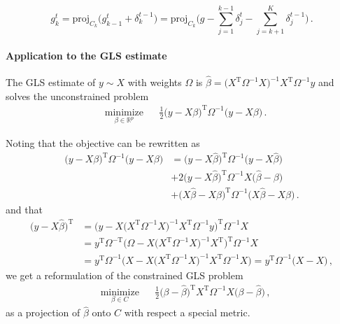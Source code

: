 \documentclass[a4paper]{article}
\newcommand{\real}{\mathbb{R}}
\newcommand{\T}{\mathrm{T}}
\begin{document}
\begin{equation*}
  g^t_k
    = \mathrm{proj}_{C_k}\bigl(
      g^t_{k-1} + \delta^{t-1}_k
    \bigr)
    = \mathrm{proj}_{C_k}\biggl(
      g - \sum_{j=1}^{k-1} \delta^t_j - \sum_{j=k+1}^K \delta^{t-1}_j
    \biggr)
    \,.
\end{equation*}



\paragraph{Application to the GLS estimate} %
\label{par:application_to_the_gls_estimate}

The GLS estimate of $y\sim X$ with weights $\Omega$ is $\hat{\beta} = \bigl(X^\T \Omega^{-1} X
\bigr)^{-1} X^\T \Omega^{-1} y$ and solves the unconstrained problem
\begin{equation} \label{eq:gls_unc}
  \begin{aligned}
    & \underset{\beta\in \real^p}{\text{minimize}}
      & & \tfrac12 \bigl(y - X \beta\bigr)^\T \Omega^{-1} \bigl(y - X \beta\bigr)
          \,.
  \end{aligned}
\end{equation}

Noting that the objective can be rewritten as
\begin{align*}
  \bigl(y - X \beta\bigr)^\T \Omega^{-1} \bigl(y - X \beta\bigr)
    &= \bigl(y - X \hat{\beta}\bigr)^\T \Omega^{-1} \bigl(y - X \hat{\beta}\bigr)
    \\
    &+ 2 \bigl(y - X \hat{\beta}\bigr)^\T \Omega^{-1} X \bigl(\hat{\beta} - \beta\bigr)
    \\
    &+ \bigl(X \hat{\beta} - X \beta\bigr)^\T \Omega^{-1} \bigl(X \hat{\beta} - X \beta\bigr)
    \,.
\end{align*}
and that
\begin{align*}
  \bigl(y - X \hat{\beta}\bigr)^\T
    &= \bigl(y - X \bigl(X^\T \Omega^{-1} X \bigr)^{-1} X^\T \Omega^{-1} y\bigr)^\T \Omega^{-1} X
    \\
    &= y^\T \Omega^{-\T} \bigl(\Omega - X \bigl(X^\T \Omega^{-1} X \bigr)^{-1} X^\T \bigr)^\T \Omega^{-1} X
    \\
    &= y^\T \Omega^{-1} \bigl(X - X \bigl(X^\T \Omega^{-1} X \bigr)^{-1} X^\T \Omega^{-1} X \bigr)
    = y^\T \Omega^{-1} \bigl(X - X\bigr)
    \,,
\end{align*}
we get a reformulation of the constrained GLS problem
\begin{equation} \label{eq:gls_proj}
  \begin{aligned}
    & \underset{\beta\in C}{\text{minimize}}
      & & \tfrac12 \bigl(\beta - \hat{\beta} \bigr)^\T X^\T \Omega^{-1} X \bigl(\beta - \hat{\beta}\bigr)
          \,,
  \end{aligned}
\end{equation}
as a projection of $\hat{\beta}$ onto $C$ with respect a special metric.

\end{document}
